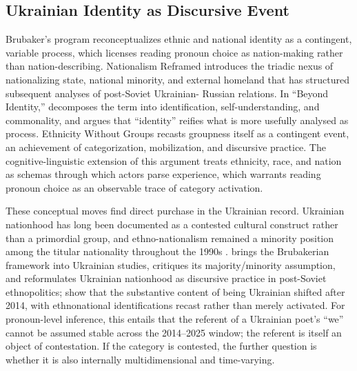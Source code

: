 \documentclass[12pt]{interact}
\theoremstyle{plain}%
\theoremstyle{definition}
\theoremstyle{remark}
\begin{document}
\subsection{Ukrainian Identity as Discursive Event}

Brubaker's program reconceptualizes ethnic and national identity as a contingent, variable process, which licenses reading pronoun choice as nation-making rather than nation-describing. Nationalism Reframed \citep{brubaker1996nationalism} introduces the triadic nexus of nationalizing state, national minority, and external homeland that has structured subsequent analyses of post-Soviet Ukrainian- Russian relations. In ``Beyond Identity,'' \citet{brubaker2000beyond} decomposes the term into identification, self-understanding, and commonality, and argues that ``identity'' reifies what is more usefully analysed as process. Ethnicity Without Groups \citep{brubaker2004ethnicity} recasts groupness itself as a contingent event, an achievement of categorization, mobilization, and discursive practice. The cognitive-linguistic extension of this argument \citep{brubaker2004ethnicity1} treats ethnicity, race, and nation as schemas through which actors parse experience, which warrants reading pronoun choice as an observable trace of category activation.

These conceptual moves find direct purchase in the Ukrainian record. Ukrainian nationhood has long been documented as a contested cultural construct rather than a primordial group, and ethno-nationalism remained a minority position among the titular nationality throughout the 1990s \citep{wilson1997ukrainian, wilson2000the}. \citet{kulyk2001the} brings the Brubakerian framework into Ukrainian studies, critiques its majority/minority assumption, and reformulates Ukrainian nationhood as discursive practice in post-Soviet ethnopolitics; \citet{kulyk2016national, kulyk2018shedding} show that the substantive content of being Ukrainian shifted after 2014, with ethnonational identifications recast rather than merely activated. For pronoun-level inference, this entails that the referent of a Ukrainian poet's ``we'' cannot be assumed stable across the 2014--2025 window; the referent is itself an object of contestation. If the category is contested, the further question is whether it is also internally multidimensional and time-varying.
\end{document}
